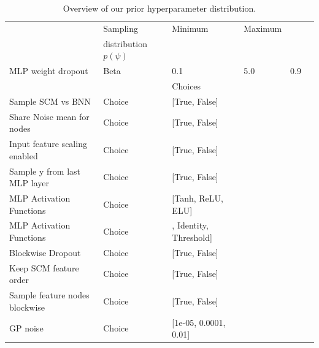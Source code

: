 \documentclass{article}
\begin{document}
\begin{table}[htbp]
\small
    \centering
    \caption{Overview of our prior hyperparameter distribution.}
    \begin{tabular}{llllll}
    \toprule
    {} & Sampling & Minimum & Maximum & & \\
    {} & distribution $p(\psi)$ &  &  & & \\
    \midrule
    MLP weight dropout &                       Beta &                    0.1 &                    5.0 &            0.9 & \\
    \toprule
    {} &  & Choices &  &  &  \\
    \midrule
    Sample SCM vs BNN &                     Choice &                                      [True, False] & & & \\
    Share Noise mean for nodes &                     Choice &                                      [True, False] & & & \\
    Input feature scaling enabled &                     Choice &                                      [True, False] & & & \\
    Sample y from last MLP layer         &                     Choice &                                      [True, False] & & &  \\
    MLP Activation Functions                   &                     Choice &  \tiny [Tanh, ReLU, ELU]& & &  \\
    MLP Activation Functions                   &                     Choice &  \tiny , Identity, Threshold] & & &  \\
    Blockwise Dropout                       &                     Choice &                                      [True, False] & & &  \\
    Keep SCM feature order                  &                     Choice &                                      [True, False] & & &  \\
    Sample feature nodes blockwise          &                     Choice &                                      [True, False] & & &  \\
    GP noise                                &                     Choice &                              \tiny  [1e-05, 0.0001, 0.01] & & & \\

\end{tabular}
\end{table}
\end{document}
